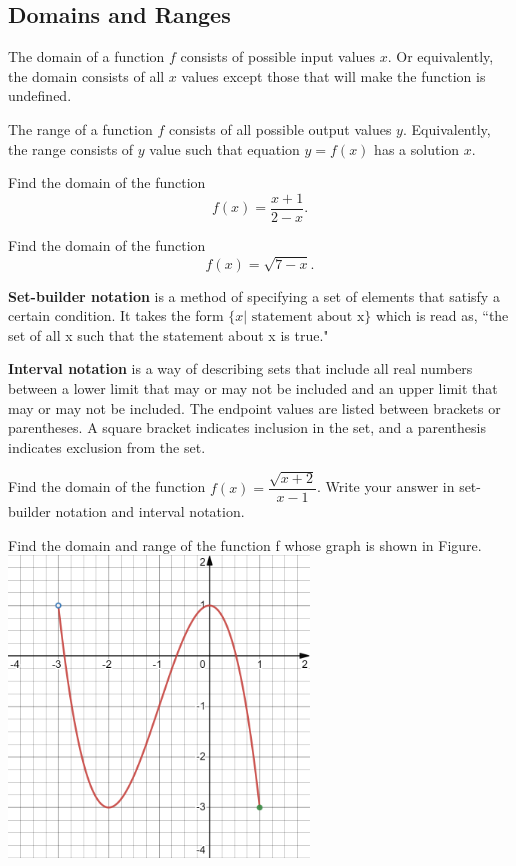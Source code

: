 \newpage

\subsection{Domains and Ranges}

The domain of a function $f$ consists of possible input values $x$. Or equivalently, the domain consists of all $x$ values except those that will make the function is undefined.

The range of a function $f$ consists of all possible output values $y$. Equivalently, the range consists of $y$ value such that equation $y=f(x)$ has a solution $x$. 

\begin{example}
  Find the domain of the function $$f(x)=\dfrac{x+1}{2-x}.$$
\end{example}

\begin{example}
  Find the domain of the function
$$
f(x)=\sqrt{7-x}.
$$
\end{example}

\textbf{Set-builder notation} is a method of specifying a set of elements that satisfy a certain condition. It takes the form $\{x|\text{ statement about x}\}$ which is read as, ``the set of all x such that the statement about x is true."

\textbf{Interval notation} is a way of describing sets that include all real numbers between a lower limit that may or may not be included and an upper limit that may or may not be included. The endpoint values are listed between brackets or parentheses. A square bracket indicates inclusion in the set, and a parenthesis indicates exclusion from the set.

\newpage

\begin{example}
  Find the domain of the function $f(x)=\dfrac{\sqrt{x+2}}{x-1}$. Write your answer in set-builder notation and interval notation.
\end{example}


\begin{example}
  Find the domain and range of the function f whose graph is shown in Figure.
  \includegraphics[width=0.6\textwidth]{figs/FindDomainRangeCubic.png}
\end{example}


